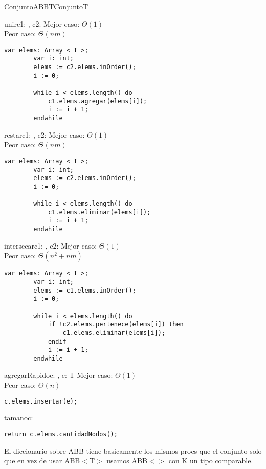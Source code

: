 \begin{module}{ConjuntoABB}{T}{Conjunto}{T}
	\begin{proc}{unir}{\Inout c1: \moduletype, \In c2: \moduletype}{}
		Mejor caso: $\Theta(1)$\\
		Peor caso: $\Theta(nm)$
		\begin{lstlisting}[numbers=none,frame=none]
		var elems: Array < T >;
		var i: int;
		elems := c2.elems.inOrder();
		i := 0;

		while i < elems.length() do
			c1.elems.agregar(elems[i]);
			i := i + 1;
		endwhile
		\end{lstlisting}
	\end{proc}

	\begin{proc}{restar}{\Inout c1: \moduletype, \In c2: \moduletype}{}
		Mejor caso: $\Theta(1)$\\
		Peor caso: $\Theta(nm)$
		\begin{lstlisting}[numbers=none,frame=none]
		var elems: Array < T >;
		var i: int;
		elems := c2.elems.inOrder();
		i := 0;

		while i < elems.length() do
			c1.elems.eliminar(elems[i]);
			i := i + 1;
		endwhile
		\end{lstlisting}
	\end{proc}

	\pagebreak

	\begin{proc}{intersecar}{\Inout c1: \moduletype, \In c2: \moduletype}{}
		Mejor caso: $\Theta(1)$\\
		Peor caso: $\Theta(n^2 + nm)$
		\begin{lstlisting}[numbers=none,frame=none]
		var elems: Array < T >;
		var i: int;
		elems := c1.elems.inOrder();
		i := 0;

		while i < elems.length() do
			if !c2.elems.pertenece(elems[i]) then
				c1.elems.eliminar(elems[i]);
			endif
			i := i + 1;
		endwhile
		\end{lstlisting}
	\end{proc}

	\begin{proc}{agregarRapido}{\Inout c: \moduletype, \In e: T}{}
		Mejor caso: $\Theta(1)$\\
		Peor caso: $\Theta(n)$
		\begin{lstlisting}[numbers=none,frame=none]
		c.elems.insertar(e);
		\end{lstlisting}
	\end{proc}

	\begin{proc}{tamano}{\In c: \moduletype}{\Int}
		\begin{lstlisting}[numbers=none,frame=none]
		return c.elems.cantidadNodos();
		\end{lstlisting}
	\end{proc}
\end{module}

El diccionario sobre ABB tiene basicamente los mismos procs que el conjunto solo que en vez de usar ABB$<$T$>$ usamos ABB$<$$>$ con K un tipo comparable.


